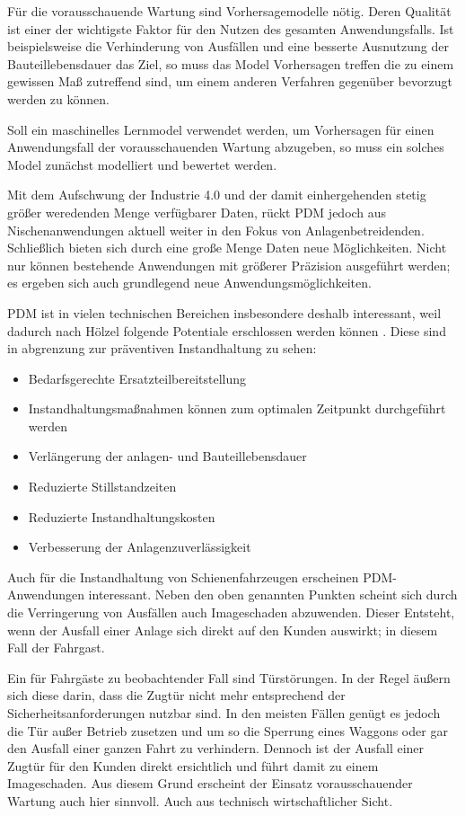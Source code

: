 Für die vorausschauende Wartung sind Vorhersagemodelle nötig. Deren Qualität ist einer der wichtigste Faktor für den Nutzen des gesamten Anwendungsfalls. Ist beispielsweise die Verhinderung von Ausfällen und eine besserte Ausnutzung der Bauteillebensdauer das Ziel, so muss das Model Vorhersagen treffen die zu einem gewissen Maß zutreffend sind, um einem anderen Verfahren gegenüber bevorzugt werden zu können.

Soll ein maschinelles Lernmodel verwendet werden, um Vorhersagen für einen Anwendungsfall der vorausschauenden Wartung abzugeben, so muss ein solches Model zunächst modelliert und bewertet werden.


Mit dem Aufschwung der Industrie 4.0 und der damit einhergehenden stetig größer weredenden Menge verfügbarer Daten, rückt PDM jedoch aus Nischenanwendungen aktuell weiter in den Fokus von Anlagenbetreidenden. Schließlich bieten sich durch eine große Menge Daten neue Möglichkeiten. Nicht nur können bestehende Anwendungen mit größerer Präzision ausgeführt werden; es ergeben sich auch grundlegend neue Anwendungsmöglichkeiten. 

PDM ist in vielen technischen Bereichen insbesondere deshalb interessant, weil  dadurch nach Hölzel folgende Potentiale erschlossen werden können . Diese sind in abgrenzung zur präventiven Instandhaltung zu sehen:
\begin{itemize}
	\item Bedarfsgerechte Ersatzteilbereitstellung
	\item Instandhaltungsmaßnahmen können zum optimalen Zeitpunkt durchgeführt werden
	\item Verlängerung der anlagen- und Bauteillebensdauer
	\item Reduzierte Stillstandzeiten
	\item Reduzierte Instandhaltungskosten
	\item Verbesserung der Anlagenzuverlässigkeit
\end{itemize}

Auch für die Instandhaltung von Schienenfahrzeugen erscheinen PDM-Anwendungen interessant. Neben den oben genannten Punkten scheint sich durch die Verringerung von Ausfällen auch Imageschaden abzuwenden. Dieser Entsteht, wenn  der Ausfall einer Anlage sich direkt auf den Kunden auswirkt; in diesem Fall der Fahrgast.

Ein für Fahrgäste zu beobachtender Fall sind Türstörungen. In der Regel äußern sich diese darin, dass die Zugtür nicht mehr entsprechend der Sicherheitsanforderungen nutzbar sind. In den meisten Fällen genügt es jedoch die Tür außer Betrieb zusetzen und um so die Sperrung eines Waggons oder gar den Ausfall einer ganzen Fahrt zu verhindern. Dennoch ist der Ausfall einer Zugtür für den Kunden direkt ersichtlich und führt damit zu einem Imageschaden. Aus diesem Grund erscheint der Einsatz vorausschauender Wartung auch hier sinnvoll. Auch aus technisch wirtschaftlicher Sicht.

